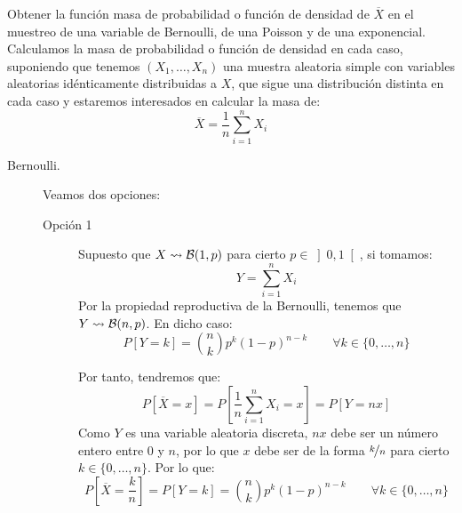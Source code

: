 \begin{ejercicio}\label{ej:funcion_masa_densidad}
    Obtener la función masa de probabilidad o función de densidad de $\overline{X}$ en el muestreo de una variable de Bernoulli, de una Poisson y de una exponencial.\\

    \noindent
    Calculamos la masa de probabilidad o función de densidad en cada caso, suponiendo que tenemos $(X_1, \ldots, X_n)$ una muestra aleatoria simple con variables aleatorias idénticamente distribuidas a $X$, que sigue una distribución distinta en cada caso y estaremos interesados en calcular la masa de:
    \begin{equation*}
        \overline{X} = \frac{1}{n}\sum_{i=1}^{n} X_i
    \end{equation*}
    \begin{description}
        \item [Bernoulli.] Veamos dos opciones:
        \begin{description}
            \item[Opción 1] Supuesto que $X\rightsquigarrow \mathcal{B}(1,p)$ para cierto $p\in \left]0,1\right[$, si tomamos:
            \begin{equation*}
                Y = \sum_{i=1}^{n}X_i
            \end{equation*}
            Por la propiedad reproductiva de la Bernoulli, tenemos que $Y\rightsquigarrow \mathcal{B}(n,p)$. En dicho caso:
            \begin{equation*}
                P[Y=k] = \binom{n}{k} p^k {(1-p)}^{n-k} \qquad \forall k\in \{0,\ldots,n\}
            \end{equation*}

            Por tanto, tendremos que:
            \begin{equation*}
                P[\overline{X} = x] = P\left[\frac{1}{n}\sum_{i=1}^{n}X_i = x\right] = P[Y = nx]
            \end{equation*}
            Como $Y$ es una variable aleatoria discreta, $nx$ debe ser un número entero entre $0$ y $n$, por lo que $x$ debe ser de la forma $\nicefrac{k}{n}$ para cierto $k\in \{0,\ldots,n\}$. Por lo que:
            \begin{equation*}
                P\left[\overline{X} = \frac{k}{n}\right] = P[Y=k] = \binom{n}{k} p^k {(1-p)}^{n-k} \qquad \forall k\in \{0,\ldots,n\}
            \end{equation*}
            

\end{description}
\end{description}
\end{ejercicio}
